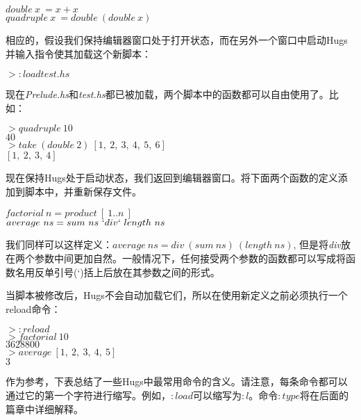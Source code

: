 \noindent\hspace*{1cm} $double~x~= x + x$\\
\hspace*{1cm} $quadruple~x~= double~(double~x)$

相应的，假设我们保持编辑器窗口处于打开状态，而在另外一个窗口中启动Hugs并输入指令使其加载这个新脚本：

\noindent\hspace*{1cm} $> :load test.hs$

现在\textit{Prelude.hs}和\textit{test.hs}都已被加载，两个脚本中的函数都可以自由使用了。比如：

\noindent\hspace*{1cm} $> quadruple~10$\\
\hspace*{1cm} $40$\\
\hspace*{1cm} $> take~(double~2)~[1,~2,~3,~4,~5,~6]$\\
\hspace*{1cm} $[1,~2,~3,~4]$

现在保持Hugs处于启动状态，我们返回到编辑器窗口。将下面两个函数的定义添加到脚本中，并重新保存文件。

\noindent\hspace*{1cm} $factorial~n = product~[~1..n~]$\\
\hspace*{1cm} $average~ns = sum~ns~`div`~length~ns$

我们同样可以这样定义：$average~ns = div~(sum~ns)~(length~ns)$,
但是将\textit{div}放在两个参数中间更加自然。一般情况下，任何接受两个参数的函数都可以写成将函数名用反单引号(`)括上后放在其参数之间的形式。

当脚本被修改后，Hugs不会自动加载它们，所以在使用新定义之前必须执行一个reload命令：

\noindent\hspace*{1cm} $> :reload$\\
\hspace*{1cm} $> factorial~10$\\
\hspace*{1cm} $3628800$\\
\hspace*{1cm} $> average~[1,~2,~3,~4,~5]$\\
\hspace*{1cm} $3$

作为参考，下表总结了一些Hugs中最常用命令的含义。请注意，每条命令都可以通过它的第一个字符进行缩写。例如，$:load$可以缩写为$:l$。命令$:type$将在后面的篇章中详细解释。

